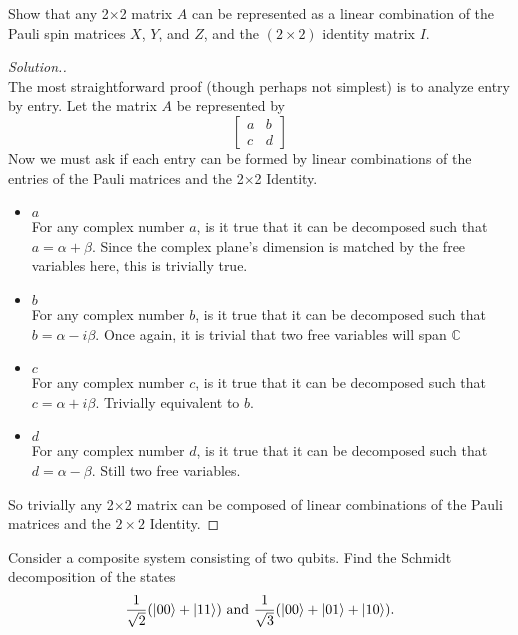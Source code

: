 \documentclass[12pt]{article}
\newenvironment{problem}[2][Problem]{\begin{trivlist}
\item[\hskip \labelsep {\bfseries #1}\hskip \labelsep {\bfseries #2.}]}{\end{trivlist}}
\begin{document}
\begin{problem}{C3}
Show that any 2$\times$2 matrix $A$ can be represented as a linear combination of the Pauli spin matrices $X$, $Y$, and $Z$, and the $(2\times2)$ identity matrix $I$.
\end{problem}

\begin{proof}[Solution.]~\\
The most straightforward proof (though perhaps not simplest) is to analyze entry by entry. Let the matrix $A$ be
represented by
$$\begin{bmatrix}
a & b\\
c & d
\end{bmatrix}$$
Now we must ask if each entry can be formed by linear combinations of the entries of the Pauli matrices and the
2$\times$2 Identity.
\begin{itemize}
\item $a$\\
For any complex number $a$, is it true that it can be decomposed such that $a=\alpha+\beta$. Since the complex
plane's dimension is matched by the free variables here, this is trivially true.
\item $b$\\
For any complex number $b$, is it true that it can be decomposed such that $b=\alpha-i\beta$. Once again, it is
trivial that two free variables will span $\mathbb{C}$
\item $c$\\
For any complex number $c$, is it true that it can be decomposed such that $c=\alpha+i\beta$. Trivially
equivalent to $b$.
\item $d$\\
For any complex number $d$, is it true that it can be decomposed such that $d=\alpha-\beta$. Still two free
variables.
\end{itemize}
So trivially any 2$\times$2 matrix can be composed of linear combinations of the Pauli matrices and the
$2\times2$ Identity.
\end{proof}

\begin{problem}{C4}
Consider a composite system consisting of two qubits. Find the Schmidt decomposition of the states
$$\frac{1}{\sqrt{2}}(|00\rangle+|11\rangle)\textnormal{ and }\frac{1}{\sqrt{3}}(|00\rangle+|01\rangle+|10\rangle).$$
\end{problem}
\end{document}
